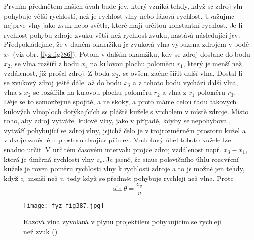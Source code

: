   Prvním předmětem našich úvah bude jev, který vzniká tehdy, když se zdroj vln pohybuje větší 
  rychlostí, než je rychlost vlny nebo fázová rychlost. Uvažujme nejprve vlny jako zvuk nebo 
  světlo, které mají určitou konstantní rychlost. Je-li rychlost pohybu zdroje zvuku větší než 
  rychlost zvuku, nastává následující jev. Předpokládejme, že v daném okamžiku je zvuková vlna 
  vybuzena zdrojem v bodě \(x_1\) (viz obr. \ref{fyz:fig386}). Potom v dalším okamžiku, kdy se 
  zdroj dostane do bodu \(x_2\), se vlna rozšíří z bodu \(x_1\) na kulovou plochu poloměru \(r_1\), 
  který je menší než vzdálenost, jíž prošel zdroj. Z bodu \(x_2\), se ovšem začne šířit další vlna. 
  Dostal-li se zvukový zdroj ještě dále, až do bodu \(x_3\) a z tohoto bodu vychází další vlna, 
  vlna z \(x_2\) se rozšířila na kulovou plochu poloměru \(r_2\) a vlna z \(x_1\) poloměru \(r_3\). 
  Děje se to samozřejmě spojitě, a ne skoky, a proto máme celou řadu takových kulových vlnoploch 
  dotýkajících se pláště kužele s vrcholem v místě zdroje. Místo toho, aby zdroj vytvářel kulové 
  vlny, jako v případě, kdyby se nepohyboval, vytváří pohybující se zdroj vlny, jejichž čelo je v 
  trojrozměrném prostoru kužel a v dvojrozměrném prostoru dvojice přímek. Vrcholový úhel tohoto 
  kužele lze snadno určit. V určitém časovém intervalu projde zdroj vzdálenost např. \(x_3 - x_1\), 
  která je úměrná rychlosti vlny \(c_v\). Je jasné, že sinus polovičního úhlu rozevření kužele je 
  roven poměru rychlosti vlny k rychlosti zdroje a to je možné jen tehdy, když \(c_v\) menší než 
  \(v\), tedy když se předmět pohybuje rychleji než vlna. Proto
  \begin{equation}\label{fyz:eq527}
    \sin\theta = \dfrac{c_v}{v}
  \end{equation}
  
  \begin{figure}[ht!] %
    \centering
    \texttt{[image: fyz\_fig387.jpg]}
    \caption{Rázová vlna vyvolaná v plynu projektilem pohybujícím se rychleji než zvuk
             (\cite[s.~687]{Feynman01})}
    \label{fyz:fig387}
  \end{figure}
  
